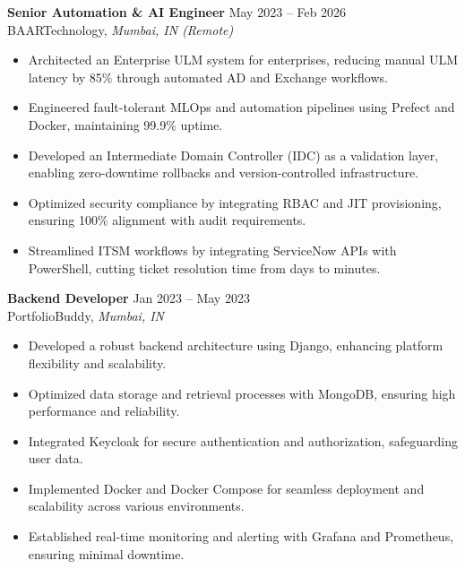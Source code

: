 \begin{center}
    \begin{raggedright}
        \normalsize
        \textbf{Senior Automation \& AI Engineer}
        \hfill {May 2023 -- Feb 2026} \\
        \small{BAARTechnology}, \textit{Mumbai, IN (Remote)}\\
        \normalsize
        \vspace{-8pt}
        \begin{itemize}
            \itemsep-3pt            
            \item Architected an Enterprise ULM system for enterprises, reducing manual ULM latency by 85\% through automated AD and Exchange workflows.
            \item Engineered fault-tolerant MLOps and automation pipelines using Prefect and Docker, maintaining 99.9\% uptime.
            \item Developed an Intermediate Domain Controller (IDC) as a validation layer, enabling zero-downtime rollbacks and version-controlled infrastructure.
            \item Optimized security compliance by integrating RBAC and JIT provisioning, ensuring 100\% alignment with audit requirements.
            \item Streamlined ITSM workflows by integrating ServiceNow APIs with PowerShell, cutting ticket resolution time from days to minutes.
        \end{itemize}
        \vspace{-8pt}
    \end{raggedright}
    
    \begin{raggedright}
        \normalsize
        \textbf{Backend Developer}
        \hfill
        {Jan 2023 -- May 2023} \\
        \small{PortfolioBuddy}, \textit{Mumbai, IN}\\
        \normalsize
        \vspace{-8pt}
        \begin{itemize}
            \itemsep-3pt            
            \item Developed a robust backend architecture using Django, enhancing platform flexibility and scalability.
            \item Optimized data storage and retrieval processes with MongoDB, ensuring high performance and reliability.
            \item Integrated Keycloak for secure authentication and authorization, safeguarding user data.
            \item Implemented Docker and Docker Compose for seamless deployment and scalability across various environments.
            \item Established real-time monitoring and alerting with Grafana and Prometheus, ensuring minimal downtime.
        \end{itemize}
        \vspace{-8pt}
    \end{raggedright}
    

\end{center}
